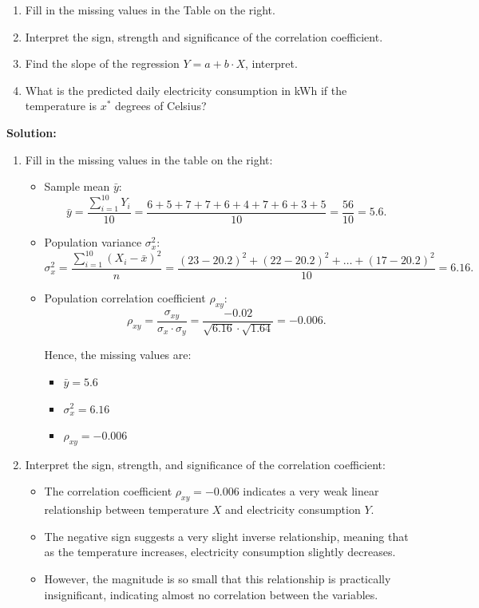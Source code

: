 \documentclass[12pt]{article}
\begin{document}
\begin{enumerate}
\begin{enumerate}
\item   Fill in the missing values in the Table on the right.
\item   Interpret the sign, strength and significance of the correlation coefficient.
\item   Find the slope of the regression $Y=a+b\cdot X$, interpret.
\item   What is the predicted  daily electricity consumption in kWh if the temperature is $x^*$ degrees of Celsius?
\end{enumerate}

{\color{blue}
\noindent \textbf{Solution:}

\begin{enumerate}

\item Fill in the missing values in the table on the right:

\begin{itemize}
    \item Sample mean \( \bar{y} \):
    \[
    \bar{y} = \frac{\sum_{i=1}^{10} Y_i}{10} = \frac{6 + 5 + 7 + 7 + 6 + 4 + 7 + 6 + 3 + 5}{10} = \frac{56}{10} = 5.6.
    \]

    \item Population variance \( \sigma_x^2 \):
    \[
    \sigma_x^2 = \frac{\sum_{i=1}^{10} (X_i - \bar{x})^2}{n} = \frac{(23 - 20.2)^2 + (22 - 20.2)^2 + \dots + (17 - 20.2)^2}{10} = 6.16.
    \]

    \item Population correlation coefficient \( \rho_{xy} \):
    \[
    \rho_{xy} = \frac{\sigma_{xy}}{\sigma_x \cdot \sigma_y} = \frac{-0.02}{\sqrt{6.16} \cdot \sqrt{1.64}} = -0.006.
    \]

    Hence, the missing values are:
    \begin{itemize}
        \item \( \bar{y} = 5.6 \)
        \item \( \sigma_x^2 = 6.16 \)
        \item \( \rho_{xy} = -0.006 \)
    \end{itemize}
\end{itemize}

\item Interpret the sign, strength, and significance of the correlation coefficient:

\begin{itemize}
    \item The correlation coefficient \( \rho_{xy} = -0.006 \) indicates a very weak linear relationship between temperature \( X \) and electricity consumption \( Y \).
    \item The negative sign suggests a very slight inverse relationship, meaning that as the temperature increases, electricity consumption slightly decreases.
    \item However, the magnitude is so small that this relationship is practically insignificant, indicating almost no correlation between the variables.
\end{itemize}


\end{enumerate}}
\end{enumerate}
\end{document}
